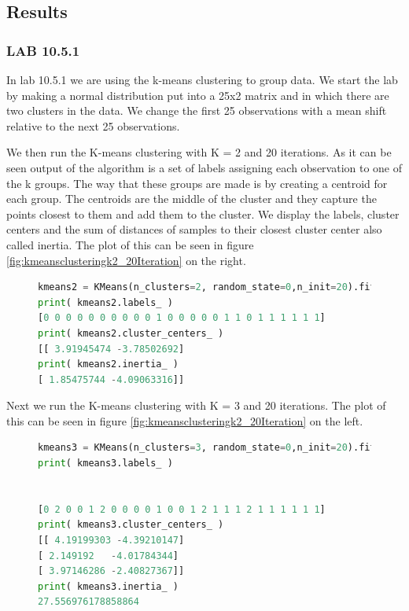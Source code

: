 \subsection{Results} %
\subsubsection*{LAB 10.5.1}
In lab 10.5.1 we are using the k-means clustering to group data. We start the lab by making a normal distribution put into a 25x2 matrix and in which there are two clusters in the data. We change the first 25 observations with a mean shift relative to the next 25 observations.

We then run the K-means clustering with K = 2 and 20 iterations. As it can be seen output of the algorithm is a set of labels assigning each observation to one of the k groups. The way that these groups are made is by
creating a centroid for each group. The centroids are the middle of the cluster and they capture the points closest to them and add them to the cluster. We display the labels, cluster centers and the sum of distances of samples to their closest cluster center also called inertia. The plot of this can be seen in figure \ref{fig:kmeansclusteringk2_20Iteration} on the right.
\begin{figure}[H]
	\begin{lstlisting}[caption=k-means clustering, label={lst:acpython}, language=Python]
kmeans2 = KMeans(n_clusters=2, random_state=0,n_init=20).fit(X)
print( kmeans2.labels_ )
[0 0 0 0 0 0 0 0 0 0 1 0 0 0 0 0 1 1 0 1 1 1 1 1 1]
print( kmeans2.cluster_centers_ )
[[ 3.91945474 -3.78502692]
print( kmeans2.inertia_ )
[ 1.85475744 -4.09063316]]
	\end{lstlisting}
\end{figure}
Next we run the K-means clustering with K = 3 and 20 iterations. The plot of this can be seen in figure \ref{fig:kmeansclusteringk2_20Iteration} on the left.
\begin{figure}[H]
	\begin{lstlisting}[caption=k-means clustering, label={lst:acpython}, language=Python]
kmeans3 = KMeans(n_clusters=3, random_state=0,n_init=20).fit(X)
print( kmeans3.labels_ )


[0 2 0 0 1 2 0 0 0 0 1 0 0 1 2 1 1 1 2 1 1 1 1 1 1]
print( kmeans3.cluster_centers_ )
[[ 4.19199303 -4.39210147]
[ 2.149192   -4.01784344]
[ 3.97146286 -2.40827367]]
print( kmeans3.inertia_ )
27.556976178858864
	\end{lstlisting}
\end{figure}



